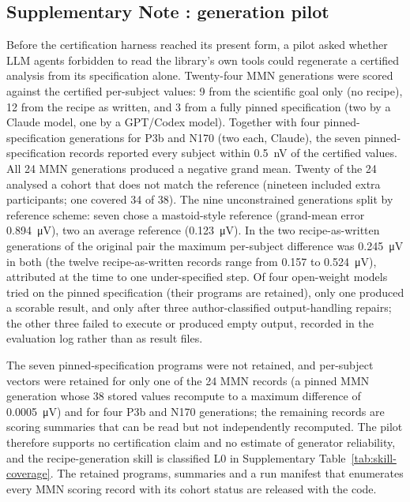 \FloatBarrier
{}
\subsection*{Supplementary Note \thesuppnote: generation pilot}
\label{si:generation}

Before the certification harness reached its present form, a pilot asked whether LLM agents forbidden to read the library's own tools could regenerate a certified analysis from its specification alone. Twenty-four MMN generations were scored against the certified per-subject values: 9 from the scientific goal only (no recipe), 12 from the recipe as written, and 3 from a fully pinned specification (two by a Claude model, one by a GPT/Codex model). Together with four pinned-specification generations for P3b and N170 (two each, Claude), the seven pinned-specification records reported every subject within \SI{0.5}{nV} of the certified values. All 24 MMN generations produced a negative grand mean. Twenty of the 24 analysed a cohort that does not match the reference (nineteen included extra participants; one covered 34 of 38). The nine unconstrained generations split by reference scheme: seven chose a mastoid-style reference (grand-mean error \SI{0.894}{\uV}), two an average reference (\SI{0.123}{\uV}). In the two recipe-as-written generations of the original pair the maximum per-subject difference was \SI{0.245}{\uV} in both (the twelve recipe-as-written records range from 0.157 to \SI{0.524}{\uV}), attributed at the time to one under-specified step. Of four open-weight models tried on the pinned specification (their programs are retained), only one produced a scorable result, and only after three author-classified output-handling repairs; the other three failed to execute or produced empty output, recorded in the evaluation log rather than as result files.

The seven pinned-specification programs were not retained, and per-subject vectors were retained for only one of the 24 MMN records (a pinned MMN generation whose 38 stored values recompute to a maximum difference of \SI{0.0005}{\uV}) and for four P3b and N170 generations; the remaining records are scoring summaries that can be read but not independently recomputed. The pilot therefore supports no certification claim and no estimate of generator reliability, and the recipe-generation skill is classified L0 in Supplementary Table~\ref*{tab:skill-coverage}. The retained programs, summaries and a run manifest that enumerates every MMN scoring record with its cohort status are released with the code.

